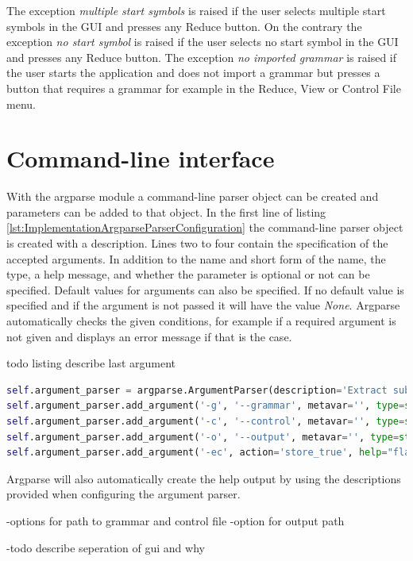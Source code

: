 The exception \textit{multiple start symbols} is raised if the user selects multiple start symbols in the GUI and presses any Reduce button. On the contrary the exception \textit{no start symbol} is raised if the user selects no start symbol in the GUI and presses any Reduce button. The exception \textit{no imported grammar} is raised if the user starts the application and does not import a grammar but presses a button that requires a grammar for example in the Reduce, View or Control File menu.

\section{Command-line interface}\label{sec:ImplementationCommandLineInterface}
With the argparse module a command-line parser object can be created and parameters can be added to that object.
In the first line of listing \ref{lst:ImplementationArgparseParserConfiguration} the command-line parser object is created with a description.
Lines two to four contain the specification of the accepted arguments.
In addition to the name and short form of the name, the type, a help message, and whether the parameter is optional or not can be specified.
Default values for arguments can also be specified.
If no default value is specified and if the argument is not passed it will have the value \textit{None}.
Argparse automatically checks the given conditions, for example if a required argument is not given and displays an error message if that is the case.

todo listing describe last argument
\begin{lstlisting}[language=Python, basicstyle=\scriptsize	,caption= Argparse command-line parser configuration,label= lst:ImplementationArgparseParserConfiguration]
self.argument_parser = argparse.ArgumentParser(description='Extract sub-syntax using TPTP syntax file and a control file')
self.argument_parser.add_argument('-g', '--grammar', metavar='', type=str, required=True, help='path of the TPTP syntax file')
self.argument_parser.add_argument('-c', '--control', metavar='', type=str, required=True, help='path of the control file')
self.argument_parser.add_argument('-o', '--output', metavar='', type=str, required=False, help='optional output file name (default output.txt)', default= "output.txt")
self.argument_parser.add_argument('-ec', action='store_true', help="flag - include external comment syntax")
\end{lstlisting}

Argparse will also automatically create the help output by using the descriptions provided when configuring the argument parser.


-options for path to grammar and control file
-option for output path

-todo describe seperation of gui and why
